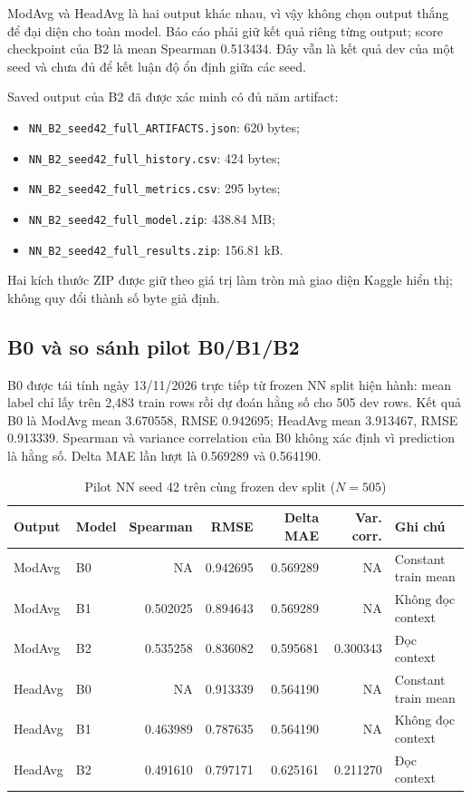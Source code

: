 \documentclass[11pt,a4paper]{article}
\newcommand{\code}[1]{\nolinkurl{#1}}
\begin{document}
ModAvg và HeadAvg là hai output khác nhau, vì vậy không chọn output thắng để đại diện cho toàn model. Báo cáo phải giữ kết quả riêng từng output; score checkpoint của B2 là mean Spearman 0.513434. Đây vẫn là kết quả dev của một seed và chưa đủ để kết luận độ ổn định giữa các seed.

Saved output của B2 đã được xác minh có đủ năm artifact:
\begin{itemize}
  \item \code{NN_B2_seed42_full_ARTIFACTS.json}: 620 bytes;
  \item \code{NN_B2_seed42_full_history.csv}: 424 bytes;
  \item \code{NN_B2_seed42_full_metrics.csv}: 295 bytes;
  \item \code{NN_B2_seed42_full_model.zip}: 438.84 MB;
  \item \code{NN_B2_seed42_full_results.zip}: 156.81 kB.
\end{itemize}
Hai kích thước ZIP được giữ theo giá trị làm tròn mà giao diện Kaggle hiển thị; không quy đổi thành số byte giả định.

\subsection{B0 và so sánh pilot B0/B1/B2}

B0 được tái tính ngày 13/11/2026 trực tiếp từ frozen NN split hiện hành: mean label chỉ lấy trên 2,483 train rows rồi dự đoán hằng số cho 505 dev rows. Kết quả B0 là ModAvg mean 3.670558, RMSE 0.942695; HeadAvg mean 3.913467, RMSE 0.913339. Spearman và variance correlation của B0 không xác định vì prediction là hằng số. Delta MAE lần lượt là 0.569289 và 0.564190.

\begin{table}[htbp]
\centering
\caption{Pilot NN seed 42 trên cùng frozen dev split ($N=505$)}
\small
\begin{tabularx}{\textwidth}{@{}llrrrrY@{}}
\toprule
Output & Model & Spearman & RMSE & Delta MAE & Var. corr. & Ghi chú \\
\midrule
ModAvg & B0 & NA & 0.942695 & 0.569289 & NA & Constant train mean \\
ModAvg & B1 & 0.502025 & 0.894643 & 0.569289 & NA & Không đọc context \\
ModAvg & B2 & 0.535258 & 0.836082 & 0.595681 & 0.300343 & Đọc context \\
\midrule
HeadAvg & B0 & NA & 0.913339 & 0.564190 & NA & Constant train mean \\
HeadAvg & B1 & 0.463989 & 0.787635 & 0.564190 & NA & Không đọc context \\
HeadAvg & B2 & 0.491610 & 0.797171 & 0.625161 & 0.211270 & Đọc context \\
\bottomrule
\end{tabularx}
\end{table}
\end{document}
